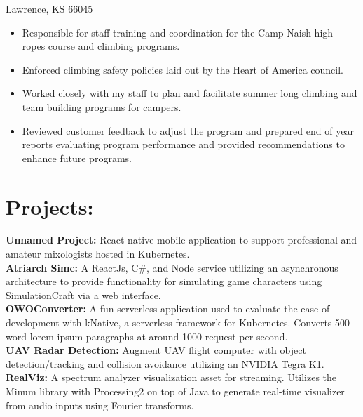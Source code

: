 \documentclass{res}
\begin{document}
\begin{resume}
\begin{tabbing}
	Lawrence, KS 66045
   \end{tabbing}\vspace{-9pt}
    \begin{itemize}
		\item Responsible for staff training and coordination for the Camp Naish high ropes course and climbing programs.
		\item Enforced climbing safety policies laid out by the Heart of America council.
		\item Worked closely with my staff to plan and facilitate summer long climbing and team building programs for campers.
		\item Reviewed customer feedback to adjust the program and prepared end of year reports evaluating program performance and provided recommendations to enhance future programs.\vspace{-15pt}
	\end{itemize}
\section{Projects:}          
{
	\textbf{Unnamed Project:} React native mobile application to support professional and amateur mixologists hosted in Kubernetes.\\
	\textbf{Atriarch Simc:} A ReactJs, C\#, and Node service utilizing an asynchronous architecture to provide functionality for simulating game characters using SimulationCraft via a web interface.\\
	\textbf{OWOConverter:} A fun serverless application used to evaluate the ease of development with kNative, a serverless framework for Kubernetes. Converts 500 word lorem ipsum paragraphs at around 1000 request per second.\\
	\textbf{UAV Radar Detection:} Augment UAV flight computer with object detection/tracking and collision avoidance utilizing an NVIDIA Tegra K1.\\
	\textbf{RealViz:} A spectrum analyzer visualization asset for streaming. Utilizes the Minum library with Processing2 on top of Java to generate real-time visualizer from audio inputs using Fourier transforms.\\
}
\end{resume}
\end{document}
